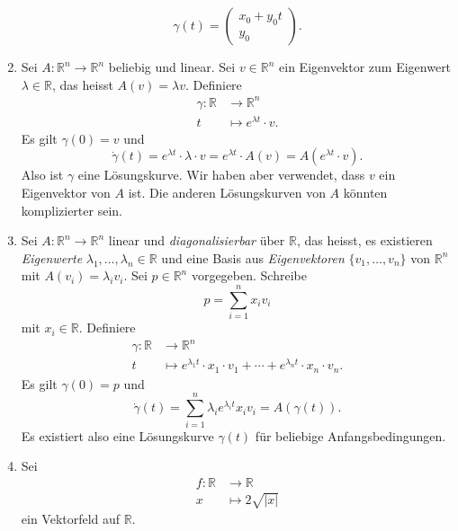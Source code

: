\documentclass[../main.tex]{subfiles}
\begin{document}
\begin{examples}
\begin{enumerate}[(1)]
      \[
        \gamma(t) =
        \begin{pmatrix}
          x_0 + y_0 t \\
          y_0
        \end{pmatrix}.
      \]
    \item Sei $A \colon \mathbb{R}^n \to \mathbb{R}^n$ 
      beliebig und linear.
      Sei $v \in \mathbb{R}^n$ ein Eigenvektor zum Eigenwert
      $\lambda \in \mathbb{R}$, das heisst
      $A(v) = \lambda v$.
      Definiere
       \begin{align*}
        \gamma \colon \mathbb{R} & \to \mathbb{R}^n \\
        t & \mapsto e^{\lambda t} \cdot v.
      \end{align*}
      Es gilt $\gamma(0) = v$ und
      \[
        \dot \gamma(t) = e^{\lambda t} \cdot \lambda \cdot v
        = e^{\lambda t}  \cdot A(v)
        = A(e^{\lambda t} \cdot v).
      \]
      Also ist $\gamma$ eine Lösungskurve.
      Wir haben aber verwendet, dass $v$ ein Eigenvektor
      von $A$ ist. Die anderen Lösungskurven von $A$ 
      könnten komplizierter sein.
    \item Sei $A \colon \mathbb{R}^n \to \mathbb{R}^n$ 
      linear und \emph{diagonalisierbar} über $\mathbb{R}$,
      das heisst, es existieren
      \emph{Eigenwerte} $\lambda_1, \dots, \lambda_n \in \mathbb{R}$ 
      und eine Basis aus \emph{Eigenvektoren}
      $\{v_1, \dots, v_n\}$ von $\mathbb{R}^n$ 
      mit $A(v_i) = \lambda_i v_i$.
      Sei $p \in \mathbb{R}^n$ vorgegeben. Schreibe
      \[
        p = \sum_{i=1}^{n} x_i v_i
      \]
      mit $x_i \in \mathbb{R}$.
      Definiere
      \begin{align*}
        \gamma \colon \mathbb{R} & \to \mathbb{R}^n \\
        t & \mapsto e^{\lambda_1 t} \cdot x_1 \cdot v_1 +
        \cdots
        +
        e^{\lambda_n t} \cdot x_n \cdot v_n.
      \end{align*}
      Es gilt $\gamma(0) = p$ und
      \[
        \dot \gamma(t) = \sum_{i=1}^{n} \lambda_i e^{\lambda_i t}x_i v_i
        = A(\gamma(t)).
      \]
      Es existiert also eine Lösungskurve $\gamma(t)$ 
      für beliebige Anfangsbedingungen.
    \item Sei
      \begin{align*}
        f \colon \mathbb{R} & \to \mathbb{R} \\
        x & \mapsto 2 \sqrt{|x|}
      \end{align*}
      ein Vektorfeld auf $\mathbb{R}$.

\end{enumerate}
\end{examples}
\end{document}
